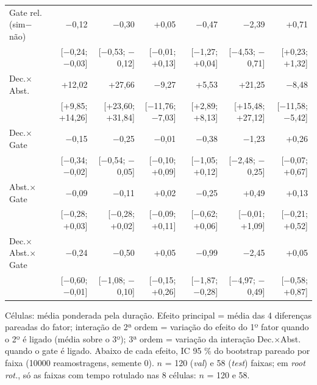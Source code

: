 \begin{table}[t]
\begin{tabular}{llllrrrrrr}
    \multicolumn{4}{l}{Gate rel. (sim$-$não)} & $-$0,12 & $-$0,30 & +0,05 & $-$0,47 & $-$2,39 & +0,71 \\
    \multicolumn{4}{l}{} & {\scriptsize [$-$0,24; $-$0,03]} & {\scriptsize [$-$0,53; $-$0,12]} & {\scriptsize [$-$0,01; +0,13]} & {\scriptsize [$-$1,27; +0,04]} & {\scriptsize [$-$4,53; $-$0,71]} & {\scriptsize [+0,23; +1,32]} \\
    \multicolumn{4}{l}{Dec.$\times$Abst.} & +12,02 & +27,66 & $-$9,27 & +5,53 & +21,25 & $-$8,48 \\
    \multicolumn{4}{l}{} & {\scriptsize [+9,85; +14,26]} & {\scriptsize [+23,60; +31,84]} & {\scriptsize [$-$11,76; $-$7,03]} & {\scriptsize [+2,89; +8,13]} & {\scriptsize [+15,48; +27,12]} & {\scriptsize [$-$11,58; $-$5,42]} \\
    \multicolumn{4}{l}{Dec.$\times$Gate} & $-$0,15 & $-$0,25 & $-$0,01 & $-$0,38 & $-$1,23 & +0,26 \\
    \multicolumn{4}{l}{} & {\scriptsize [$-$0,34; $-$0,02]} & {\scriptsize [$-$0,54; $-$0,05]} & {\scriptsize [$-$0,10; +0,09]} & {\scriptsize [$-$1,05; +0,12]} & {\scriptsize [$-$2,48; $-$0,25]} & {\scriptsize [$-$0,07; +0,67]} \\
    \multicolumn{4}{l}{Abst.$\times$Gate} & $-$0,09 & $-$0,11 & +0,02 & $-$0,25 & +0,49 & +0,13 \\
    \multicolumn{4}{l}{} & {\scriptsize [$-$0,28; +0,03]} & {\scriptsize [$-$0,28; +0,02]} & {\scriptsize [$-$0,09; +0,11]} & {\scriptsize [$-$0,62; +0,06]} & {\scriptsize [$-$0,01; +1,09]} & {\scriptsize [$-$0,21; +0,52]} \\
    \multicolumn{4}{l}{Dec.$\times$Abst.$\times$Gate} & $-$0,24 & $-$0,50 & +0,05 & $-$0,99 & $-$2,45 & +0,05 \\
    \multicolumn{4}{l}{} & {\scriptsize [$-$0,60; $-$0,01]} & {\scriptsize [$-$1,08; $-$0,10]} & {\scriptsize [$-$0,15; +0,26]} & {\scriptsize [$-$1,87; $-$0,28]} & {\scriptsize [$-$4,97; $-$0,49]} & {\scriptsize [$-$0,58; +0,87]} \\
    \bottomrule
  \end{tabular}
  \vspace{2pt}
  \parbox{\linewidth}{\footnotesize Células: média ponderada pela duração. Efeito principal = média das 4 diferenças pareadas do fator; interação de 2ª ordem = variação do efeito do 1º fator quando o 2º é ligado (média sobre o 3º); 3ª ordem = variação da interação Dec.$\times$Abst. quando o gate é ligado. Abaixo de cada efeito, IC 95 \% do bootstrap pareado por faixa (10000 reamostragens, semente 0). $n$ = 120 (\emph{val}) e 58 (\emph{test}) faixas; em \emph{root rot.}, só as faixas com tempo rotulado nas 8 células: $n$ = 120 e 58.}
\end{table}
